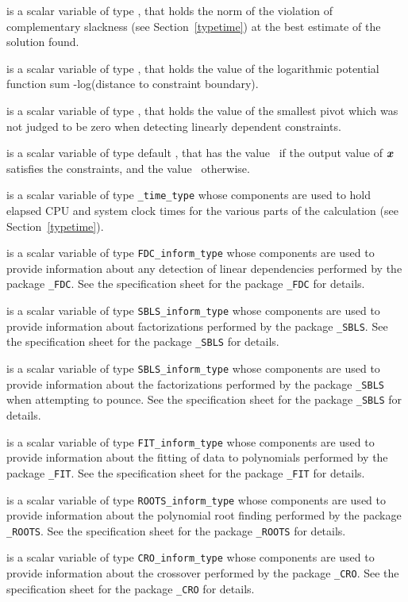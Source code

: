 \begin{description}
is a scalar variable of type \realdp,
that holds the norm of the violation of complementary slackness
(see Section~\ref{typetime}) at the best estimate of the solution found.

is a scalar variable of type \realdp,
that holds the value of the logarithmic potential function
sum -log(distance to constraint boundary).

is a scalar variable of type \realdp,
that holds the value of the smallest pivot which was not judged to be 
zero when detecting linearly dependent constraints.

 is a scalar variable of type default \logical, that has the
value \true\ if the output value of ${\bm{x}}$ satisfies the constraints,
and the value \false\ otherwise.

 is a scalar variable of type {\tt \packagename\_time\_type}
whose components are used to hold elapsed CPU and system clock times for the
various parts of the calculation (see Section~\ref{typetime}).

 is a scalar variable of type
{\tt FDC\_inform\_type}
whose components are used to provide information about
any detection of linear dependencies
performed by the package
{\tt \libraryname\_FDC}.
See the specification sheet for the package
{\tt \libraryname\_FDC} for details.

 is a scalar variable of type
{\tt SBLS\_inform\_type}
whose components are used to provide information about factorizations
performed by the package
{\tt \libraryname\_SBLS}.
See the specification sheet for the package
{\tt \libraryname\_SBLS} for details.

 is a scalar variable of type
{\tt SBLS\_inform\_type}
whose components are used to provide information about the factorizations
performed by the package
{\tt \libraryname\_SBLS} when attempting to pounce.
See the specification sheet for the package
{\tt \libraryname\_SBLS} for details.

 is a scalar variable of type
{\tt FIT\_inform\_type}
whose components are used to provide information about the fitting
of data to polynomials performed by the package
{\tt \libraryname\_FIT}.
See the specification sheet for the package
{\tt \libraryname\_FIT} for details.

 is a scalar variable of type
{\tt ROOTS\_inform\_type}
whose components are used to provide information about the
polynomial root finding performed by the package
{\tt \libraryname\_ROOTS}.
See the specification sheet for the package
{\tt \libraryname\_ROOTS} for details.

 is a scalar variable of type
{\tt CRO\_inform\_type}
whose components are used to provide information about the crossover
performed by the package
{\tt \libraryname\_CRO}.
See the specification sheet for the package
{\tt \libraryname\_CRO} for details.

\end{description}

